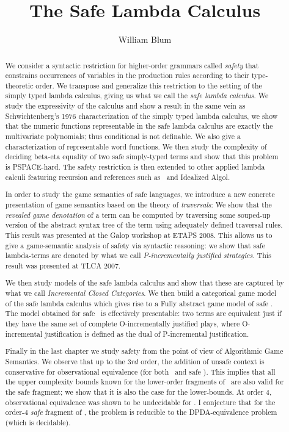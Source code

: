 \documentclass[a4paper,twoside,openright,draft]{ociamthesis}
\author{William Blum}
\title{The Safe Lambda Calculus}
\begin{document}
\maketitle

\begin{abstract}
We consider a syntactic restriction for higher-order grammars called \emph{safety}  that  constrains occurrences of variables in the production rules according to their type-theoretic order. We transpose and generalize this restriction to the setting of the simply typed lambda calculus, giving us what we call the \emph{safe lambda calculus}.  We study the expressivity of the calculus and show a result in the same vein as Schwichtenberg's 1976 characterization of the simply typed lambda calculus, we show that the numeric functions representable in the safe lambda calculus are exactly the
multivariate polynomials; thus conditional is not definable. We
also give a characterization of representable word functions.
We then study the complexity of deciding beta-eta equality of two safe simply-typed terms and show that this problem is PSPACE-hard. The safety restriction is then extended to other applied lambda calculi featuring recursion and references such as \pcf\ and Idealized Algol.

In order to study the game semantics of safe languages, we introduce a new concrete presentation of game semantics based on the theory of \emph{traversals}: We show that the \emph{revealed game denotation} of a term can be computed by traversing some souped-up version of the abstract syntax tree of the term using adequately defined traversal rules. This result was presented at the Galop workshop at ETAPS 2008. This allows us to give a game-semantic analysis of safety via syntactic reasoning: we show that safe lambda-terms are denoted by what we call \emph{P-incrementally justified strategies}. This result was presented at TLCA 2007.

We then study models of the safe lambda calculus and show that these are captured by what we call \emph{Incremental Closed Categories}. We then build a categorical game model of the safe lambda calculus which gives rise to a Fully abstract game model of safe \ialgol.
The model obtained for safe \ialgol\ is effectively presentable: two terms are equivalent just if they have the same set of complete O-incrementally justified plays, where O-incremental justification is defined as the dual of P-incremental justification.

Finally in the last chapter we study safety from the point of view of Algorithmic Game Semantics.  We observe that up to the $3rd$ order, the addition of unsafe context is conservative for observational equivalence (for both \ialgol\ and safe \ialgol). This implies that all the upper complexity bounds known for the lower-order fragments of \ialgol\ are also valid for the safe fragment; we show that it is also the case for the lower-bounds. At order $4$, observational equivalence was shown to be undecidable for \ialgol.
I conjecture that for the order-$4$ \emph{safe} fragment of \ialgol, the problem is reducible to the DPDA-equivalence problem (which is decidable).


\end{abstract}
\end{document}
